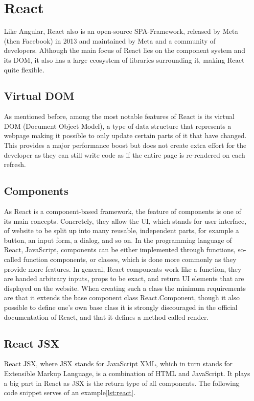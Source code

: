 \section{React}
Like Angular, React also is an open-source SPA-Framework, released by Meta (then Facebook) in 2013 and maintained by
Meta and a community of developers. Although the main focus of React lies on the component system and its DOM, it also 
has a large ecosystem of libraries surrounding it, making React quite flexible.

\subsection{Virtual DOM}
As mentioned before, among the most notable features of React is its virtual DOM (Document Object Model), a type of 
data structure that represents a webpage making it possible to only update certain parts of it that have changed. 
This provides a major performance boost but does not create extra effort for the developer as they can still write 
code as if the entire page is re-rendered on each refresh.

\subsection{Components}
As React is a component-based framework, the feature of components is one of its main concepts. Concretely, they
allow the UI, which stands for user interface, of website to be split up into many reusable, independent parts,
for example a button, an input form, a dialog, and so on. In the programming language of React, JavaScript,
components can be either implemented through functions, so-called function components, or classes, which is done 
more commonly as they provide more features. In general, React components work like a function, they are handed 
arbitrary inputs, props to be exact, and return UI elements that are displayed on the website. When creating 
such a class the minimum requirements are that it extends the base component class React.Component, though it 
also possible to define one's own base class it is strongly discouraged in the official documentation of React,
and that it defines a method called render. \cite{ReactComponentProps} \cite{ReactComponent}

\subsection{React JSX}
React JSX, where JSX stands for JavaScript XML, which in turn stands for Extensible Markup Language, is a combination
of HTML and JavaScript. It plays a big part in React as JSX is the return type of all components. The following 
code snippet serves of an example\ref{lst:react}.


